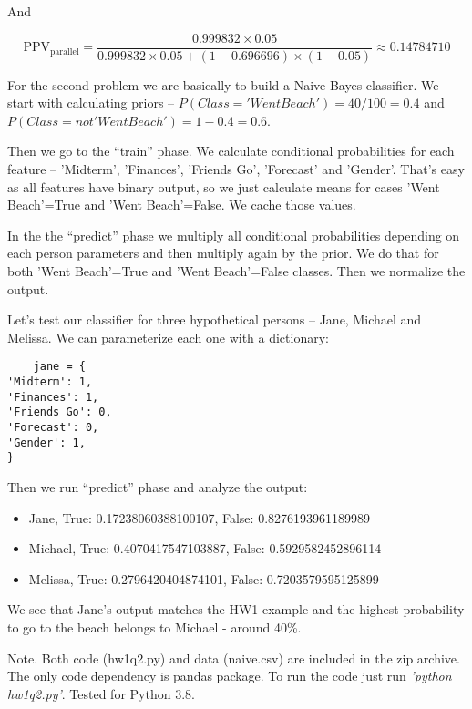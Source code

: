 \documentclass[a4 paper]{article}
\begin{document}
And 

$$
\mathrm{PPV_{parallel}}=\frac{0.999832‬ \times 0.05}
{0.999832 \times 0.05 + (1-0.696696) \times (1-0.05)} \approx 0.14784710
$$






For the second problem we are basically to build 
a Naive Bayes classifier. We start with calculating 
priors -- $P(Class='Went Beach')=40/100=0.4$ 
and $P(Class=not'Went Beach')=1-0.4=0.6$. 

Then we go to the ``train'' phase. We calculate 
conditional probabilities 
for each feature -- 'Midterm', 'Finances', 
'Friends Go', 'Forecast' and 'Gender'. That's 
easy as all features have binary output, so
we just calculate means for cases 'Went Beach'=True 
and 'Went Beach'=False. We cache those values.

In the the ``predict'' phase we multiply all 
conditional probabilities depending on each 
person parameters and then multiply again by 
the prior. We do that for both  
'Went Beach'=True and 'Went Beach'=False
classes. Then we normalize the output.

Let's test our classifier for three hypothetical 
persons -- Jane, Michael and Melissa. We can 
parameterize each one with a dictionary:

\begin{verbatim}
    jane = {
'Midterm': 1,
'Finances': 1,
'Friends Go': 0,
'Forecast': 0,
'Gender': 1,
}
\end{verbatim}	 

Then we run ``predict'' phase and 
analyze the output:
\begin{itemize}
	\item Jane, True: 0.17238060388100107, False: 0.8276193961189989
	\item Michael, True: 0.4070417547103887, False: 0.5929582452896114
	\item Melissa, True: 0.2796420404874101, False: 0.7203579595125899
\end{itemize}

We see that Jane's output matches the HW1 example and
the highest probability to go to the beach belongs to Michael 
- around 40\%.

Note. Both code (hw1q2.py) and data (naive.csv) are included 
in the zip archive. The only code dependency is pandas package.
To run the code just run \textit{'python hw1q2.py'}. 
Tested for Python 3.8.
\end{document}
